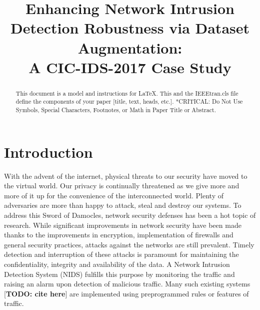 \documentclass[conference]{IEEEtran}
\begin{document}
	
	\title{Enhancing Network Intrusion Detection Robustness via Dataset Augmentation:\\ A CIC-IDS-2017 Case Study}
	
	\author{
	}
	
	\maketitle
	
	\begin{abstract}
		This document is a model and instructions for \LaTeX.
		This and the IEEEtran.cls file define the components of your paper [title, text, heads, etc.]. *CRITICAL: Do Not Use Symbols, Special Characters, Footnotes, 
		or Math in Paper Title or Abstract.
	\end{abstract}
	
	
	\section{Introduction}
	With the advent of the internet, physical threats to our security have moved to the virtual world. Our privacy is continually threatened as we give more and more of it up for the convenience of the interconnected world. Plenty of adversaries are more than happy to attack, steal and destroy our systems. To address this Sword of Damocles, network security defenses has been a hot topic of research. While significant improvements in network security have been made thanks to the improvements in encryption, implementation of firewalls and general security practices, attacks against the networks are still prevalent. Timely detection and interruption of these attacks is paramount for maintaining the confidentiality, integrity and availability of the data. A Network Intrusion Detection System (NIDS) fulfills this purpose by monitoring the traffic and raising an alarm upon detection of malicious traffic. Many such existing systems [\textbf{TODO: cite here}] are implemented using preprogrammed rules or features of traffic. 
	
\end{document}

